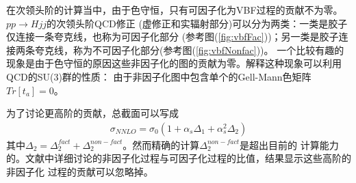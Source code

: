 在次领头阶的计算当中，由于色守恒，只有可因子化为VBF过程的贡献不为零。$pp\to Hjj$的次领头阶QCD修正
(虚修正和实辐射部分)可以分为两类：一类是胶子仅连接一条夸克线，也称为可因子化部分
(参考图(\ref{fig:vbfFac}))；另一类是胶子连接两条夸克线，称为不可因子化部分(参考图(\ref{fig:vbfNonfac}))。
一个比较有趣的现象是由于色守恒的原因这些非因子化的图的贡献为零。解释这种现象可以利用QCD的SU(3)群的性质：
由于非因子化图中包含单个的Gell-Mann色矩阵$Tr[t_a] = 0$。

为了讨论更高阶的贡献，总截面可以写成
\begin{eqnarray}
\sigma_{NNLO} = \sigma_0(1 + \alpha_s\Delta_1 + \alpha^2_s\Delta_2)
\end{eqnarray}
其中$\Delta_2 = \Delta^{fact}_2 + \Delta^{non-fact}_2$。然而精确的计算$\Delta^{non-fact}_2$是超出目前的
计算能力的。文献\cite{big-vbf}中详细讨论的非因子化过程与可因子化过程的比值，结果显示这些高阶的非因子化
过程的贡献可以忽略掉。


